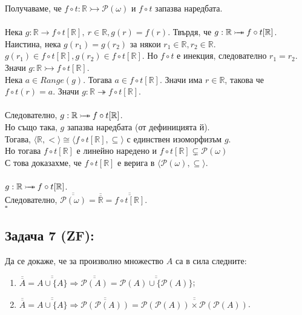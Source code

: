\documentclass[french]{article}
\begin{document}
    Получаваме, че $f \circ t : \mathbb{R} \rightarrowtail \mathcal{P}(\mathbb{\omega})$ и $f \circ t$ запазва наредбата. \\
    \\
    Нека $g : \mathbb{R} \to f \circ t[\mathbb{R}],\ r \in \mathbb{R}, g(r) = f(r)$. Твърдя, че $g : \mathbb{R} \mathbin{\rightarrowtail \hspace{-8pt} \twoheadrightarrow} f \circ t[\mathbb{R}]$. \\
    Наистина, нека $g(r_1) = g(r_2)$ за някои $r_1 \in \mathbb{R}, r_2 \in \mathbb{R}$. \\
    $g(r_1) \in f \circ t[\mathbb{R}], g(r_2) \in f \circ t[\mathbb{R}]$. Но $f \circ t$ е инекция, следователно $r_1 = r_2$. Значи $g : \mathbb{R} \rightarrowtail f \circ t[\mathbb{R}]$. \\ 
    Нека $a \in Range(g)$. Тогава $a \in f \circ t[\mathbb{R}]$. Значи има $r \in \mathbb{R}$, такова че $f \circ t(r) = a$. Значи $g : \mathbb{R} \twoheadrightarrow f \circ t[\mathbb{R}]$. \\ 
    \\
    Следователно, $g : \mathbb{R} \mathbin{\rightarrowtail \hspace{-8pt} \twoheadrightarrow} f \circ t[\mathbb{R}]$. \\
    Но също така, $g$ запазва наредбата (от дефиницията й). \\
    Тогава, $\langle \mathbb{R}, < \rangle \cong \langle f \circ t[\mathbb{R}], \subseteq \rangle$ с единствен изоморфизъм $g$.\\
    Но тогава $f \circ t[\mathbb{R}]$ е линейно наредено и $f \circ t[\mathbb{R}] \subsetneq \mathcal{P}(\mathbb{\omega})$ \\
	С това доказахме, че $f \circ t[\mathbb{R}]$ е верига в $\langle \mathcal{P}(\omega), \subseteq \rangle$. \\
	\\
	$g : \mathbb{R} \mathbin{\rightarrowtail \hspace{-8pt} \twoheadrightarrow} f \circ t[\mathbb{R}]$. \\
	Следователно, $\overline{\overline{\mathcal{P}(\omega)}} = \overline{\overline{\mathbb{R}}} = \overline{\overline{f \circ t[\mathbb{R}]}}$. \\
	$\square$
	
	
	\subsection*{Задача 7 (ZF):}
	Да се докаже, че за произволно множество $A$ са в сила
	следните:
	\begin{enumerate}
		\item $\overline{\overline{A}} = \overline{\overline{A \cup \{A\}}} \Rightarrow \overline{\overline{\mathcal{P}(A)}} = \overline{\overline{\mathcal{P}(A) \cup \{\mathcal{P}(A)\}}}$;
		\item $\overline{\overline{A}} = \overline{\overline{A \cup \{A\}}} \Rightarrow \overline{\overline{\mathcal{P}({\mathcal{P}(A)})}} = \overline{\overline{\mathcal{P}({\mathcal{P}(A)}) \times \mathcal{P}({\mathcal{P}(A)})}}$.
	\end{enumerate}
\end{document}

